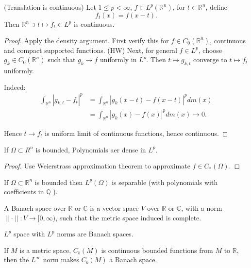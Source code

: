 \begin{proposition}(Translation is continuous)
	Let $1 \le p < \infty $, $f \in L^p(\mathbb{R}^n)$, for  $t \in \mathbb{R}^n$, define
	\[
		f_t(x)  =f(x - t)
	.\] 
	Then $\mathbb{R}^n \ni t \mapsto f_t \in L^p$ is continuous.
\end{proposition}
\begin{proof}
	Apply the density argument. First verify this for $f \in C_0(\mathbb{R}^n)$, continuous and compact supported functions. (HW) Next, for general $f \in L^p$, choose $g_k \in C_0(\mathbb{R}^n)$ such that $g_k \to f$ uniformly in $L^p$. Then $t \mapsto g_{k, t}$ converge to $t \mapsto f_t$ uniformly. 

	Indeed:
	\begin{align*}
		\int _{\mathbb{R}^n} \left| g_{k, t} - f_t \right| ^p 
		&= \int _{\mathbb{R}^n} \left| g_{k}(x - t) - f(x - t) \right| ^p d m(x)\\
		&= \int _{\mathbb{R}^n} \left| g_{k}(x) - f(x) \right| ^p d m(x) \to  0
	.\end{align*} 

	Hence $t \to f_t$ is uniform limit of continuous functions, hence continuous.
\end{proof}

\begin{theorem}
	If  $\Omega\subset R^n$ is bounded, Polynomials aer dense in $L^p$.
\end{theorem}
\begin{proof}
	Use Weierstrass approximation theorem to approximate $f \in C_* (\Omega)$.
\end{proof}

\begin{corollary}
	If $\Omega \subset \mathbb{R}^n	$ is bounded then $L^p(\Omega)$ is separable (with polynomials with coefficients in $\mathbb{Q}$ ).
\end{corollary}


\begin{definition}
	A Banach space over $\mathbb{R}$ or $\mathbb{C}$ is a vector space $V$ over $\mathbb{R}$ or $\mathbb{C}$, with a norm $\|\cdot\|: V \to [0, \infty )$, such that the metric space induced is complete.
\end{definition}

\begin{example}
	$L^p$ space with $L^p$ norms are Banach spaces.

	If $M$ is a metric space, $C_b(M)$ is continuous bounded functions from $M$ to $\mathbb{R}$, then the $L^\infty $ norm makes $C_b(M)$ a Banach space.
\end{example}

